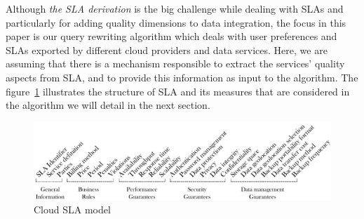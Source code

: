 Although \textit{the SLA derivation} is the big challenge while dealing with
SLAs and particularly for adding quality dimensions to data integration, the
focus in this paper is our query rewriting algorithm which deals with user
preferences and SLAs exported by different cloud providers and data services.
Here, we are assuming that there is a mechanism responsible to extract the
services' quality aspects from SLA, and to provide this information as input to
the algorithm. The figure~\ref{fig:cloudsla} illustrates the structure of SLA
and its measures that are considered in the algorithm we will detail in the next
section.   

\begin{figure}[h!]
\center
\includegraphics[scale=0.47]{Cloud_SLA.pdf}
\caption{Cloud SLA model}\label{fig:cloudsla}
\end{figure}